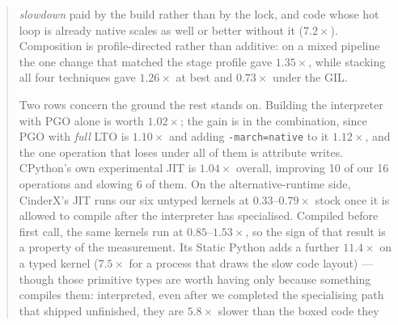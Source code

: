 \documentclass[10pt,a4paper]{article}
\newcommand{\meas}[2]{#2}
\newcommand{\code}[1]{\texttt{\small #1}}
\begin{document}
\begin{abstract}
\emph{slowdown} paid by the build rather than by the lock, and code whose hot loop is already native scales as well
or better without it ($\meas{ratio:b4_threads-gil:c_ffi_uniform/gil/T1|b4_threads-gil:c_ffi_uniform/gil/T8}{7.2}\times$). Composition is profile-directed rather than additive: on a mixed pipeline the one
change that matched the stage profile gave $\meas{ratio:b7_pipeline-gil:end_to_end/gil/v0_pure|b7_pipeline-gil:end_to_end/gil/v2_numba_native}{1.35}\times$, while stacking all four techniques gave
$\meas{ratio:b7_pipeline-ft:end_to_end/ft/v0_pure|b7_pipeline-ft:end_to_end/ft/v4_all}{1.26}\times$ at best and $\meas{ratio:b7_pipeline-gil:end_to_end/gil/v0_pure|b7_pipeline-gil:end_to_end/gil/v4_all}{0.73}\times$ under the GIL.

Two rows concern the ground the rest stands on. Building the interpreter with PGO alone is worth
$\meas{geomean:b5_buildcfg-plain|b5_buildcfg-pgo}{1.02}\times$; the gain is in the combination, since PGO with \emph{full} LTO is $\meas{geomean:b5_buildcfg-plain|b5_buildcfg-pgo_ltofull}{1.10}\times$ and
adding \code{-march=native} to it $\meas{geomean:b5_buildcfg-plain|b5_buildcfg-pgo_ltofull_native}{1.12}\times$, and the one operation that loses under all of
them is attribute writes. CPython's own experimental JIT is $\meas{geomean:b5_buildcfg-plain|b5_buildcfg-jit}{1.04}\times$ overall, improving 10 of
our 16 operations and slowing 6 of them. On the alternative-runtime side, CinderX's
JIT runs our six untyped kernels at $0.33$--$\meas{ratio:b6_cinderx-fork_jit:binarytrees/fork_jit|b6_cinderx-stock:binarytrees/stock}{0.79}\times$ stock once it is allowed to compile
after the interpreter has specialised. Compiled before first call, the same kernels run at
$0.85$--$\meas{ratio:b6_cinderx-jitopt_compile_at_first_call:matmul/jitopt_compile_at_first_call|b6_cinderx-stock:matmul/stock}{1.53}\times$, so the sign of that result is a property of the measurement. Its
Static Python adds a further $\meas{ratio:b6_static-fork_static_adaptive:matmul96_int/fork_static_adaptive/boxed_jit|b6_static-fork_static_adaptive:matmul96_int/fork_static_adaptive/static_jit}{11.4}\times$ on a typed kernel ($\meas{ratio:b6_static-fork_static:matmul96_int/fork_static/boxed_jit|b6_static-fork_static:matmul96_int/fork_static/static_jit}{7.5}\times$ for a process that draws the slow code layout) --- though those primitive types are
worth having only because something compiles them: interpreted, even after we completed the
specialising path that shipped unfinished, they are $\meas{ratio:b6_static-fork_static_adaptive:matmul96_int/fork_static_adaptive/static_interp|b6_static-fork_static_adaptive:matmul96_int/fork_static_adaptive/boxed_python}{5.8}\times$ slower than the boxed code they

\end{abstract}
\end{document}
